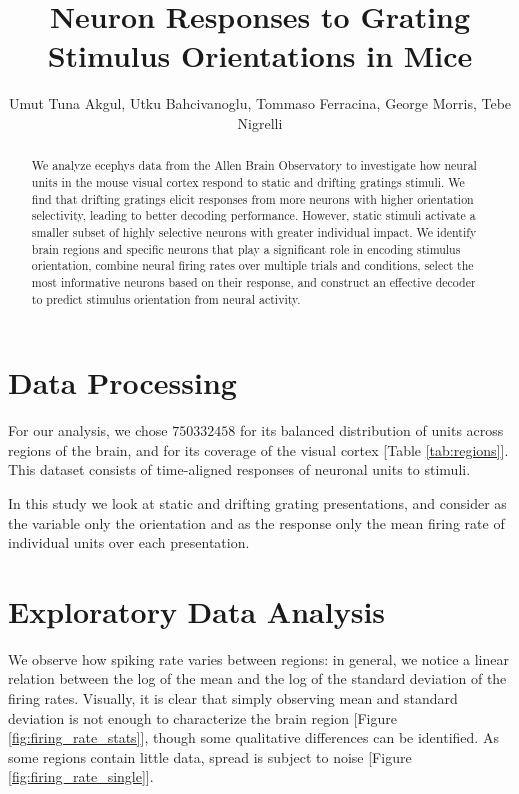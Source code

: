 \documentclass[10pt,twocolumn]{article}
\title{\Large \textbf{Neuron Responses to Grating Stimulus Orientations in Mice}}
\author{
  Umut Tuna Akgul, Utku Bahcivanoglu, Tommaso Ferracina, George Morris, Tebe Nigrelli
}
\date{\today\\ [1ex] \hrule}
\begin{document}
\maketitle
\thispagestyle{empty}
\pagestyle{empty}

\begin{abstract}
  We analyze ecephys data from the Allen Brain Observatory \cite{allen_brain_observatory} to investigate how neural units in the mouse visual cortex respond to static and drifting gratings stimuli. We find that drifting gratings elicit responses from more neurons with higher orientation selectivity, leading to better decoding performance. However, static stimuli activate a smaller subset of highly selective neurons with greater individual impact. We identify brain regions and specific neurons that play a significant role in encoding stimulus orientation, combine neural firing rates over multiple trials and conditions, select the most informative neurons based on their response, and construct an effective decoder to predict stimulus orientation from neural activity.
\end{abstract}

\section{Data Processing}

For our analysis, we chose $750332458$ for its balanced distribution of units across regions of the brain, and for its coverage of the visual cortex [Table \ref{tab:regions}].  This dataset consists of time-aligned responses of neuronal units to stimuli.

In this study we look at static and drifting grating presentations, and consider as the variable only the orientation and as the response only the mean firing rate of individual units over each presentation.

\section{Exploratory Data Analysis}

We observe how spiking rate varies between regions: in general, we notice a linear relation between the log of the mean and the log of the standard deviation of the firing rates. Visually, it is clear that simply observing mean and standard deviation is not enough to characterize the brain region [Figure \ref{fig:firing_rate_stats}], though some qualitative differences can be identified. As some regions contain little data, spread is subject to noise [Figure \ref{fig:firing_rate_single}].
\end{document}
